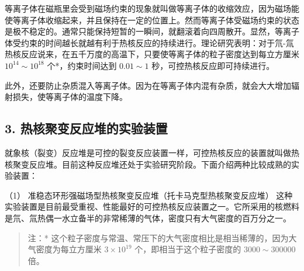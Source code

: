 等离子体在磁瓶里会受到磁场约束的现象就叫做等离子体的收缩效应，因为磁场能使等离子体收缩起来，并且保持在一定的位置上。然而等离子体受磁场约束的状态是极不稳定的。通常只能保持短暂的一瞬间，就翻滚着向四周散开。显然，等离子体受约束的时间越长就越有利于热核反应的持续进行。理论研究表明：对于氘-氚热核反应说来，在五千万度的高温下，只要使等离子体的粒子密度达到每立方厘米
\(10^{14} \sim 10^{18}\) 个*，约束时间达到 \(0.01 \sim 1\)
秒，可控热核反应即可持续进行。

此外，还要防止杂质混入等离子体。因为在等离子体内混有杂质，就会大大增加辐射损失，使等离子体的温度下降。

\subsection{3.
热核聚变反应堆的实验装置}

就象核（裂变）反应堆是可控的裂变反应装置一样，可控热核反应的装置就叫做热核聚变反应堆。目前这种反应堆还处于实验研究阶段。下面介绍两种比较成熟的实验装置：

（1） 准稳态环形强磁场型热核聚变反应堆（托卡马克型热核聚变反应堆）
这种实验装置是目前最受重视、性能最好的可控热核反应装置之一。它所采用的核燃料是氘、氚热偶一水立备半的非常稀薄的气体，密度只有大气密度的百万分之一。

\begin{quote}
注：*
这个粒子密度与常温、常压下的大气密度相比是相当稀薄的，因为大气密度为每立方厘米
\(3 \times 10^{19}\) 个，即相当于这个粒子密度的 \(3000 \sim 300000\)
倍。
\end{quote}

